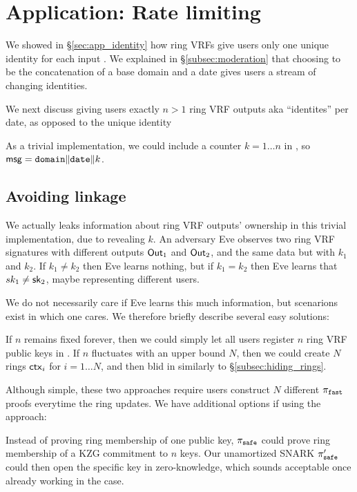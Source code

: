 \section{Application: Rate limiting}
\label{sec:app_rate_limits}

We showed in \S\ref{sec:app_identity} how ring VRFs give users only
one unique identity for each input \msg.  
We explained in \S\ref{subsec:moderation} that choosing \msg to be
the concatenation of a base domain and a date gives users a stream of changing identities.

We next discuss giving users exactly $n > 1$ ring VRF outputs aka
``identites'' per date, as opposed to the unique identity 



As a trivial implementation, we could include a counter $k = 1 \ldots n$
in \msg, so $\mathsf{msg} = \mathtt{domain} \| \mathtt{date} \| k$.


\subsection{Avoiding linkage}

We actually leaks information about ring VRF outputs' ownership
 in this trivial implementation, due to revealing $k$.
%
An adversary Eve observes two ring VRF signatures with different outputs
${\mathsf{Out}}_1$ and ${\mathsf{Out}}_2$, and the same data but with $k_1$ and $k_2$.
If $k_1 \ne k_2$ then Eve learns nothing, but if $k_1 = k_2$ then
 Eve learns that $sk_1 \ne \mathsf{sk}_2$, maybe representing different users. 

We do not necessarily care if Eve learns this much information,
but scenarions exist in which one cares.  We therefore briefly describe
several easy solutions:

If $n$ remains fixed forever, then we could simply let all users
register $n$ ring VRF public keys in \ctx.
If $n$ fluctuates with an upper bound $N$, then we could create $N$
rings $\mathsf{ctx}_i$ for $i = 1 \ldots N$, and
 then blid \comring in \pifast similarly to \S\ref{subsec:hiding_rings}.

Although simple, these two approaches require users construct $N$
different $\pi_{\mathtt{fast}}$ proofs everytime the ring \ctx updates.
We have additional options if using the \pisafe approach: 

Instead of proving ring membership of one public key,
$\pi_{\mathtt{safe}}$ could prove ring membership of a KZG commitment to $n$ keys.
Our unamortized SNARK $\pi_{\mathtt{safe}}'$ could then open the specific key in
zero-knowledge, which sounds acceptable once already working in the \pisafe case.

